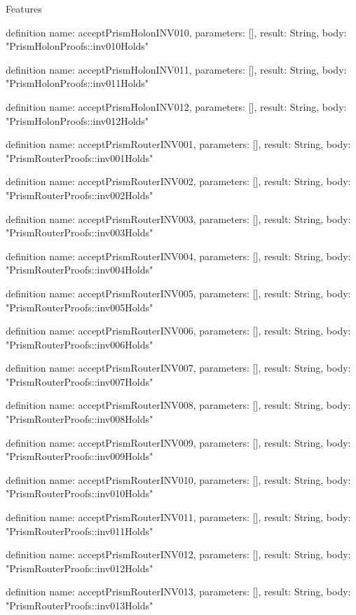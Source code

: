 \begin{lexlean}{Features}
\begin{semanticmodule}
definition{
  name: acceptPrismHolonINV010,
  parameters: [],
  result: String,
  body: "PrismHolonProofs::inv010Holds"
}

definition{
  name: acceptPrismHolonINV011,
  parameters: [],
  result: String,
  body: "PrismHolonProofs::inv011Holds"
}

definition{
  name: acceptPrismHolonINV012,
  parameters: [],
  result: String,
  body: "PrismHolonProofs::inv012Holds"
}

definition{
  name: acceptPrismRouterINV001,
  parameters: [],
  result: String,
  body: "PrismRouterProofs::inv001Holds"
}

definition{
  name: acceptPrismRouterINV002,
  parameters: [],
  result: String,
  body: "PrismRouterProofs::inv002Holds"
}

definition{
  name: acceptPrismRouterINV003,
  parameters: [],
  result: String,
  body: "PrismRouterProofs::inv003Holds"
}

definition{
  name: acceptPrismRouterINV004,
  parameters: [],
  result: String,
  body: "PrismRouterProofs::inv004Holds"
}

definition{
  name: acceptPrismRouterINV005,
  parameters: [],
  result: String,
  body: "PrismRouterProofs::inv005Holds"
}

definition{
  name: acceptPrismRouterINV006,
  parameters: [],
  result: String,
  body: "PrismRouterProofs::inv006Holds"
}

definition{
  name: acceptPrismRouterINV007,
  parameters: [],
  result: String,
  body: "PrismRouterProofs::inv007Holds"
}

definition{
  name: acceptPrismRouterINV008,
  parameters: [],
  result: String,
  body: "PrismRouterProofs::inv008Holds"
}

definition{
  name: acceptPrismRouterINV009,
  parameters: [],
  result: String,
  body: "PrismRouterProofs::inv009Holds"
}

definition{
  name: acceptPrismRouterINV010,
  parameters: [],
  result: String,
  body: "PrismRouterProofs::inv010Holds"
}

definition{
  name: acceptPrismRouterINV011,
  parameters: [],
  result: String,
  body: "PrismRouterProofs::inv011Holds"
}

definition{
  name: acceptPrismRouterINV012,
  parameters: [],
  result: String,
  body: "PrismRouterProofs::inv012Holds"
}

definition{
  name: acceptPrismRouterINV013,
  parameters: [],
  result: String,
  body: "PrismRouterProofs::inv013Holds"
}


\end{semanticmodule}
\end{lexlean}
